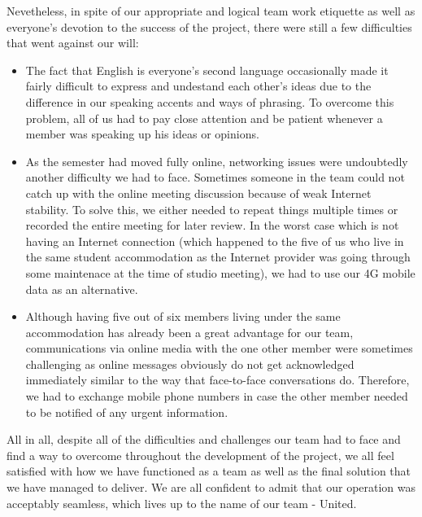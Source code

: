   \par Nevetheless, in spite of our appropriate and logical team work etiquette as well as everyone's devotion to the success of the project, there were still a few difficulties that went against our will:
    \begin{itemize}
      \item The fact that English is everyone's second language occasionally made it fairly difficult to express and undestand each other's ideas due to the difference in our speaking accents and ways of phrasing. To overcome this problem, all of us had to pay close attention and be patient whenever a member was speaking up his ideas or opinions. 
      \item As the semester had moved fully online, networking issues were undoubtedly another difficulty we had to face. Sometimes someone in the team could not catch up with the online meeting discussion because of weak Internet stability. To solve this, we either needed to repeat things multiple times or recorded the entire meeting for later review. In the worst case which is not having an Internet connection (which happened to the five of us who live in the same student accommodation as the Internet provider was going through some maintenace at the time of studio meeting), we had to use our 4G mobile data as an alternative.
      \item Although having five out of six members living under the same accommodation has already been a great advantage for our team, communications via online media with the one other member were sometimes challenging as online messages obviously do not get acknowledged immediately similar to the way that face-to-face conversations do. Therefore, we had to exchange mobile phone numbers in case the other member needed to be notified of any urgent information.
    \end{itemize}
  \par All in all, despite all of the difficulties and challenges our team had to face and find a way to overcome throughout the development of the project, we all feel satisfied with how we have functioned as a team as well as the final solution that we have managed to deliver. We are all confident to admit that our operation was acceptably seamless, which lives up to the name of our team - United.   
